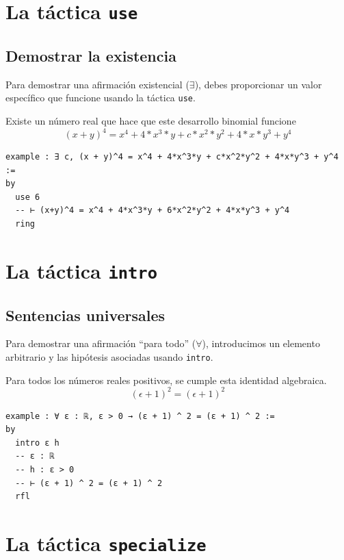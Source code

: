 \section{La táctica \texttt{use}}

\subsection*{Demostrar la existencia}

Para demostrar una afirmación existencial ($\exists$), debes proporcionar un
valor específico que funcione usando la táctica \texttt{use}.

\begin{theorem}
  Existe un número real que hace que este desarrollo binomial funcione
  \[ (x + y)^4 = x^4 + 4*x^3*y + c*x^2*y^2 + 4*x*y^3 + y^4 \]
\end{theorem}

\begin{verbatim}
example : ∃ c, (x + y)^4 = x^4 + 4*x^3*y + c*x^2*y^2 + 4*x*y^3 + y^4 :=
by
  use 6
  -- ⊢ (x+y)^4 = x^4 + 4*x^3*y + 6*x^2*y^2 + 4*x*y^3 + y^4
  ring
\end{verbatim}

\section{La táctica \texttt{intro}}

\subsection*{Sentencias universales}

Para demostrar una afirmación ``para todo'' ($\forall$), introducimos un
elemento arbitrario y las hipótesis asociadas usando \texttt{intro}.

\begin{theorem}
Para todos los números reales positivos, se cumple esta identidad
algebraica.
\[(\epsilon + 1)^2 = (\epsilon + 1)^2 \]
\end{theorem}

\begin{verbatim}
example : ∀ ε : ℝ, ε > 0 → (ε + 1) ^ 2 = (ε + 1) ^ 2 :=
by
  intro ε h
  -- ε : ℝ
  -- h : ε > 0
  -- ⊢ (ε + 1) ^ 2 = (ε + 1) ^ 2
  rfl
\end{verbatim}

\section{La táctica \texttt{specialize}}

